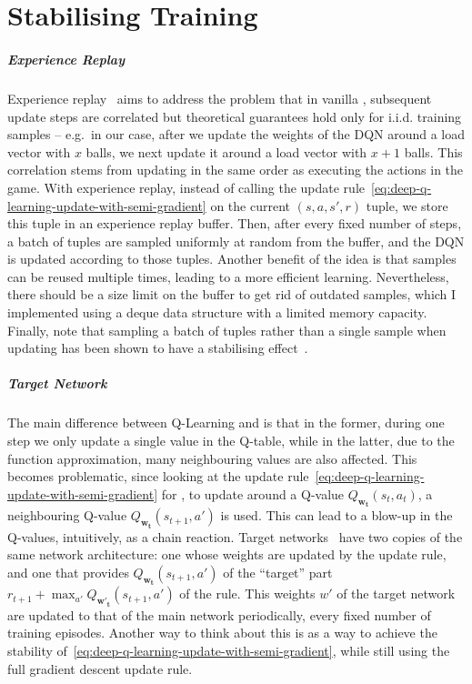 \chapter{Stabilising Training}\label{stabilising-training} 



\paragraph{Experience Replay}

Experience replay~\cite{lin1992experiencereplay} aims to address the problem that in vanilla \DQL, subsequent update steps are correlated but theoretical guarantees hold only for i.i.d. training samples -- e.g.\  in our case, after we update the weights of the DQN around a load vector with $x$ balls, we next update it around a load vector with $x+1$ balls. This correlation stems from updating in the same order as executing the actions in the game. With experience replay, instead of calling the update rule~\eqref{eq:deep-q-learning-update-with-semi-gradient} on the current $(s, a, s', r)$ tuple, we store this tuple in an experience replay buffer. Then, after every fixed number of steps, a batch of tuples are sampled uniformly at random from the buffer, and the DQN is updated according to those tuples. Another benefit of the idea is that samples can be reused multiple times, leading to a more efficient learning. Nevertheless, there should be a size limit on the buffer to get rid of outdated samples, which I implemented using a deque data structure with a limited memory capacity. Finally, note that sampling a batch of tuples rather than a single sample when updating has been shown to have a stabilising effect~\cite{qian2020batchingsgd}.


\paragraph{Target Network}


The main difference between Q-Learning and \DQL is that in the former, during one step we only update a single value in the Q-table, while in the latter, due to the function approximation, many neighbouring values are also affected. This becomes problematic, since looking at the update rule~\eqref{eq:deep-q-learning-update-with-semi-gradient} for \DQL, to update around a Q-value $Q_{\mathbf{w_t}}(s_t, a_t)$, a neighbouring Q-value $Q_{\mathbf{w_t}}(s_{t+1}, a')$ is used. This can lead to a blow-up in the Q-values, intuitively, as a chain reaction. Target networks~\cite{fan2020target} have two copies of the same network architecture: one whose weights are updated by the update rule, and one that provides $Q_{\mathbf{w_t}}(s_{t+1}, a')$ of the ``target'' part $r_{t+1}+ \max_{a'} Q_{\mathbf{w'_t}}(s_{t+1}, a')$ of the rule. This weights $w'$ of the target network are updated to that of the main network periodically, every fixed number of training episodes. Another way to think about this is as a way to achieve the stability of~\eqref{eq:deep-q-learning-update-with-semi-gradient}, while still using the full gradient descent update rule.


